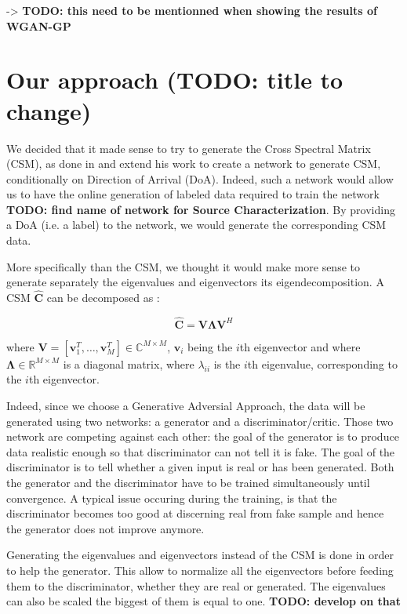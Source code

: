 \documentclass{article}
\begin{document}
-> \textbf{TODO: this need to be mentionned when showing the results of WGAN-GP}


\section{Our approach (\textbf{TODO: title to change})}

We decided that it made sense to try to generate the Cross Spectral Matrix (CSM), as done in \cite{gerstoft2020parametric} and extend his work to create a network to generate CSM, conditionally on Direction of Arrival (DoA). Indeed, such a network would allow us to have the online generation of labeled data required to train the network \textbf{TODO: find name of network for Source Characterization}. By providing a DoA (i.e. a label) to the network, we would generate the corresponding CSM data.

More specifically than the CSM, we thought it would make more sense to generate separately the eigenvalues and eigenvectors its eigendecomposition. A CSM $\mathbf{\hat{C}}$ can be decomposed as :

\begin{equation}
    \mathbf{\hat{C}} = \mathbf{V} \mathbf{\Lambda} \mathbf{V}^H
\end{equation}

where $\mathbf{V} = [\mathbf{v}_1^T, \dots, \mathbf{v}_M^T] \in \mathbb{C}^{M \times M}$, $\mathbf{v}_i$ being the $i$th eigenvector and where $\mathbf{\Lambda} \in \mathbb{R}^{M \times M}$ is a diagonal matrix, where $\lambda_{ii}$ is the $i$th eigenvalue, corresponding to the $i$th eigenvector.

Indeed, since we choose a Generative Adversial Approach, the data will be generated using two networks: a generator and a discriminator/critic. Those two network are competing against each other: the goal of the generator is to produce data realistic enough so that discriminator can not tell it is fake. The goal of the discriminator is to tell whether a given input is real or has been generated. Both the generator and the discriminator have to be trained simultaneously until convergence. A typical issue occuring during the training, is that the discriminator becomes too good at discerning real from fake sample and hence the generator does not improve anymore.

Generating the eigenvalues and eigenvectors instead of the CSM is done in order to help the generator. This allow to normalize all the eigenvectors before feeding them to the discriminator, whether they are real or generated. The eigenvalues can also be scaled the biggest of them is equal to one. \textbf{TODO: develop on that}
\end{document}
